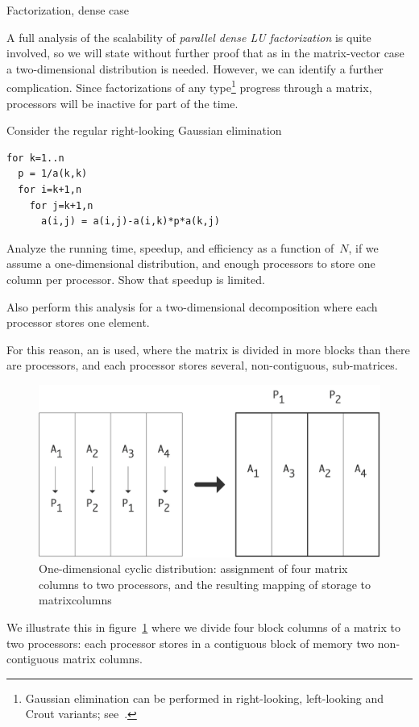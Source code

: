
 {Factorization, dense case}
\label{sec:LUscaling}

A full analysis of the scalability of
%
\emph{parallel dense LU factorization}
%
is quite
involved, so we will state without further proof that as in the matrix-vector case a
two-dimensional distribution is needed. However, we can identify a
further complication. Since factorizations of any
type\footnote{Gaussian elimination can be performed in right-looking,
  left-looking and Crout variants; see~\cite{TSoPMC}.}
progress through a matrix, processors will be inactive for part of the
time.

\begin{exercise}
  Consider the regular right-looking Gaussian elimination
\begin{verbatim}
for k=1..n
  p = 1/a(k,k)
  for i=k+1,n
    for j=k+1,n
      a(i,j) = a(i,j)-a(i,k)*p*a(k,j)
\end{verbatim}
  Analyze the running time, speedup, and efficiency as a function
  of~$N$, if we assume a one-dimensional distribution, and enough
  processors to store one column per processor. Show that speedup is
  limited.

  Also perform this analysis for a two-dimensional decomposition where
  each processor stores one element.
\end{exercise}


For this reason, an  is used, where
the matrix is divided in more blocks than there are processors,
and each processor stores several, non-contiguous, sub-matrices. 
\begin{figure}[ht]
  \includegraphics[scale=.11]{graphics/cyclic-1}
  \caption{One-dimensional cyclic distribution: assignment of four
    matrix columns to two processors, and the resulting mapping of
    storage to matrixcolumns}
  \label{fig:cyclic-1}
\end{figure}
We illustrate this in figure~\ref{fig:cyclic-1} where we divide four
block columns of a matrix to two processors: each processor stores in
a contiguous block of memory two non-contiguous matrix columns.

